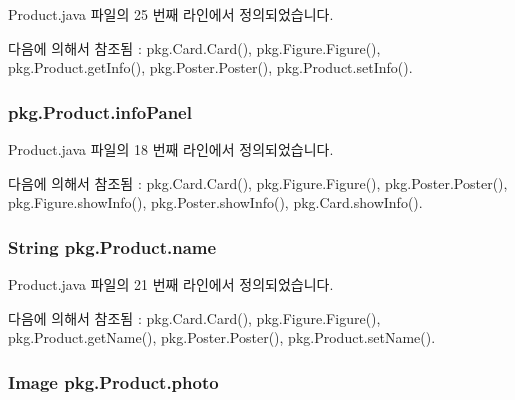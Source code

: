 Product.\+java 파일의 25 번째 라인에서 정의되었습니다.



다음에 의해서 참조됨 \+:  pkg.\+Card.\+Card(), pkg.\+Figure.\+Figure(), pkg.\+Product.\+get\+Info(), pkg.\+Poster.\+Poster(), pkg.\+Product.\+set\+Info().

\subsubsection[{\texorpdfstring{info\+Panel}{infoPanel}}]{ pkg.\+Product.\+info\+Panel\hspace{0.3cm}{\ttfamily [protected]}}\hypertarget{classpkg_1_1_product_a6755de182d9383bc860fa44a8a01789d}{}\label{classpkg_1_1_product_a6755de182d9383bc860fa44a8a01789d}


Product.\+java 파일의 18 번째 라인에서 정의되었습니다.



다음에 의해서 참조됨 \+:  pkg.\+Card.\+Card(), pkg.\+Figure.\+Figure(), pkg.\+Poster.\+Poster(), pkg.\+Figure.\+show\+Info(), pkg.\+Poster.\+show\+Info(), pkg.\+Card.\+show\+Info().

\subsubsection[{\texorpdfstring{name}{name}}]{\setlength{\rightskip}{0pt plus 5cm}String pkg.\+Product.\+name\hspace{0.3cm}{\ttfamily [protected]}}\hypertarget{classpkg_1_1_product_acdadb9558664acdfd23eff5b2b77ae90}{}\label{classpkg_1_1_product_acdadb9558664acdfd23eff5b2b77ae90}


Product.\+java 파일의 21 번째 라인에서 정의되었습니다.



다음에 의해서 참조됨 \+:  pkg.\+Card.\+Card(), pkg.\+Figure.\+Figure(), pkg.\+Product.\+get\+Name(), pkg.\+Poster.\+Poster(), pkg.\+Product.\+set\+Name().

\subsubsection[{\texorpdfstring{photo}{photo}}]{\setlength{\rightskip}{0pt plus 5cm}Image pkg.\+Product.\+photo\hspace{0.3cm}{\ttfamily [protected]}}\hypertarget{classpkg_1_1_product_a5d279eb4556860b90305cc26a3ee69be}{}\label{classpkg_1_1_product_a5d279eb4556860b90305cc26a3ee69be}


